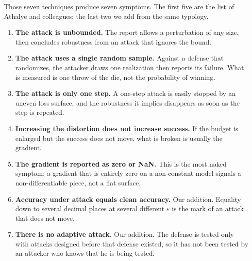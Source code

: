 Those seven techniques produce seven symptoms. The first five are the list of Athalye and
colleagues; the last two we add from the same typology.

\begin{enumerate}
  \item \textbf{The attack is unbounded.} The report allows a perturbation of any size,
        then concludes robustness from an attack that ignores the bound.
  \item \textbf{The attack uses a single random sample.} Against a defense that randomizes,
        the attacker draws one realization then reports its failure. What is measured is
        one throw of the die, not the probability of winning.
  \item \textbf{The attack is only one step.} A one-step attack is easily stopped by
        an uneven loss surface, and the robustness it implies disappears
        as soon as the step is repeated.
  \item \textbf{Increasing the distortion does not increase success.} If the budget is enlarged
        but the success does not move, what is broken is usually the gradient.
  \item \textbf{The gradient is reported as zero or NaN.} This is the most naked symptom: a gradient
        that is entirely zero on a non-constant model signals a non-differentiable
        piece, not a flat surface.
  \item \textbf{Accuracy under attack equals clean accuracy.} Our addition.
        Equality down to several decimal places at several different $\varepsilon$
        is the mark of an attack that does not move.
  \item \textbf{There is no adaptive attack.} Our addition. The defense is tested only
        with attacks designed before that defense existed, so it has not been tested
        by an attacker who knows that he is being tested.
\end{enumerate}




